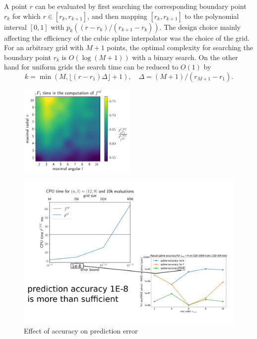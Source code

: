 A point $r$ can be evaluated by first searching the corresponding boundary point $r_k$ for which $r\in[r_k,r_{k+1}]$, and then mapping $[r_k,r_{k+1}]$ to the polynomial interval $[0,1]$ with $p_k((r-r_k)/(r_{k+1}-r_k))$.
The design choice mainly affecting the efficiency of the cubic spline interpolator was the choice of the grid.
For an arbitrary grid with $M+1$ points, the optimal complexity for searching the boundary point $r_k$ is $O(\log(M+1))$ with a binary search.
On the other hand for uniform grids the search time can be reduced to $O(1)$ by
\begin{equation}
    k = \min(M,\lfloor (r-r_1)\Delta \rfloor+1), \quad \Delta = (M+1)/(r_{M+1}-r_1).
\end{equation}
\begin{figure}
    \centering
    \includegraphics[width=0.5\textwidth]{fig/fig_hyp1f1_contribution_in_radial_contribution.pdf}
    \caption{}
    \label{fig:hyp1f1_contribution}
\end{figure}
\begin{figure}
    \includegraphics[width=\textwidth]{fig/slide20_2.png}
    \caption{Effect of accuracy on prediction error}
    \label{fig:spline-accuracy-prediction-error}
\end{figure}\\
